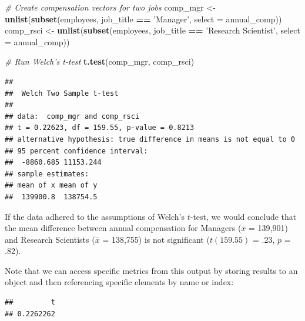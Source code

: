 \documentclass[]{book}
\newenvironment{Shaded}{\begin{snugshade}}{\end{snugshade}}
\newcommand{\CommentTok}[1]{\textcolor[rgb]{0.56,0.35,0.01}{\textit{#1}}}
\newcommand{\DataTypeTok}[1]{\textcolor[rgb]{0.13,0.29,0.53}{#1}}
\newcommand{\KeywordTok}[1]{\textcolor[rgb]{0.13,0.29,0.53}{\textbf{#1}}}
\newcommand{\NormalTok}[1]{#1}
\newcommand{\OperatorTok}[1]{\textcolor[rgb]{0.81,0.36,0.00}{\textbf{#1}}}
\newcommand{\StringTok}[1]{\textcolor[rgb]{0.31,0.60,0.02}{#1}}
\begin{document}
\begin{Shaded}
\begin{Highlighting}[]
\CommentTok{# Create compensation vectors for two jobs}
\NormalTok{comp_mgr <-}\StringTok{ }\KeywordTok{unlist}\NormalTok{(}\KeywordTok{subset}\NormalTok{(employees, job_title }\OperatorTok{==}\StringTok{ 'Manager'}\NormalTok{, }\DataTypeTok{select =}\NormalTok{ annual_comp))}
\NormalTok{comp_rsci <-}\StringTok{ }\KeywordTok{unlist}\NormalTok{(}\KeywordTok{subset}\NormalTok{(employees, job_title }\OperatorTok{==}\StringTok{ 'Research Scientist'}\NormalTok{, }\DataTypeTok{select =}\NormalTok{ annual_comp))}

\CommentTok{# Run Welch's t-test}
\KeywordTok{t.test}\NormalTok{(comp_mgr, comp_rsci)}
\end{Highlighting}
\end{Shaded}

\begin{verbatim}
## 
##  Welch Two Sample t-test
## 
## data:  comp_mgr and comp_rsci
## t = 0.22623, df = 159.55, p-value = 0.8213
## alternative hypothesis: true difference in means is not equal to 0
## 95 percent confidence interval:
##  -8860.685 11153.244
## sample estimates:
## mean of x mean of y 
##  139900.8  138754.5
\end{verbatim}

If the data adhered to the assumptions of Welch's \(t\)-test, we would conclude that the mean difference between annual compensation for Managers (\(\bar{x}\) = 139,901) and Research Scientists (\(\bar{x}\) = 138,755) is not significant (\(t(159.55)\) = .23, \(p\) = .82).

Note that we can access specific metrics from this output by storing results to an object and then referencing specific elements by name or index:

\begin{Shaded}
\end{Shaded}

\begin{verbatim}
##         t 
## 0.2262262
\end{verbatim}
\end{document}

